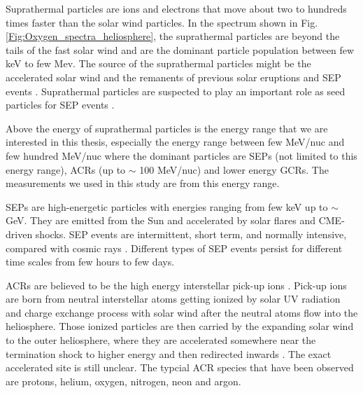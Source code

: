 
Suprathermal particles are ions and electrons that move about two to hundreds times faster than the solar wind particles. In the spectrum shown in Fig.\ref{Fig:Oxygen_spectra_heliosphere}, the suprathermal particles are beyond the tails of the fast solar wind and are the dominant particle population between few keV to few Mev. The source of the suprathermal particles might be the accelerated solar wind and the remanents of previous solar eruptions and \ac{SEP} events \citep{Gloeckler1995SSRv}. Suprathermal particles are suspected to play an important role as seed particles for \ac{SEP} events \citep{Kahler2019ApJ}.

Above the energy of suprathermal particles is the energy range that we are interested in this thesis, especially the energy range between few MeV/nuc and few hundred MeV/nuc where the dominant particles are \acp{SEP} (not limited to this energy range), \acp{ACR} (up to $\sim$ 100 MeV/nuc) and lower energy \acp{GCR}. The measurements we used in this study are from this energy range.

\acp{SEP} are high-energetic particles with energies ranging from few keV up to $\sim$ GeV. They are emitted from the Sun and accelerated by solar flares and \ac{CME}-driven shocks. \acs{SEP} events are intermittent, short term, and normally intensive, compared with cosmic rays \citep{Reames1999}. Different types of \acs{SEP} events persist for different time scales from few hours to few days. %

\acp{ACR} are believed to be the high energy interstellar pick-up ions \citep{Giacalone2022SSRv}. Pick-up ions are born from neutral interstellar atoms getting ionized by solar UV radiation and charge exchange process with solar wind after the neutral atoms flow into the heliosphere. Those ionized particles are then carried by the expanding solar wind to the outer heliosphere, where they are accelerated somewhere near the termination shock to higher energy and then redirected inwards \citep{russell2016space}. The exact accelerated site is still unclear. The typcial \ac{ACR} species that have been observed are protons, helium, oxygen, nitrogen, neon and argon. 

